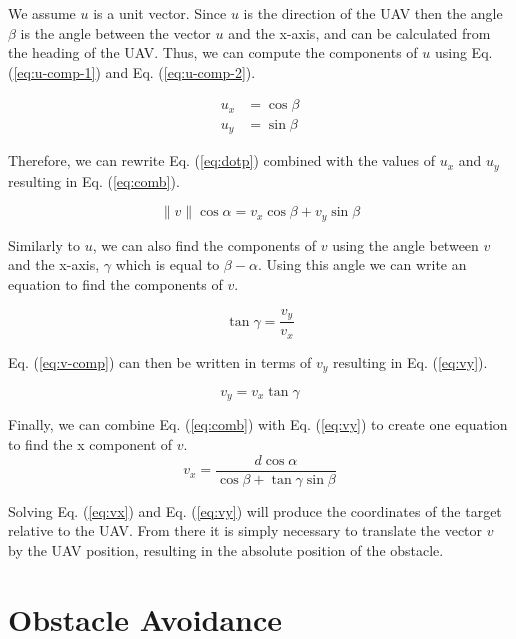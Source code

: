 We assume $u$ is a unit vector. Since $u$ is the direction of the UAV then the angle $\beta$ is the angle between the vector $u$
and the x-axis, and can be calculated from the heading of the UAV. Thus, we can compute the components of $u$ using Eq. 
(\ref{eq:u-comp-1}) and Eq. (\ref{eq:u-comp-2}). 

\begin{align}
	u_x &= \cos \beta
	\label{eq:u-comp-1} \\
	u_y &= \sin \beta
	\label{eq:u-comp-2}
\end{align}

Therefore, we can rewrite Eq. (\ref{eq:dotp}) combined with the values of $u_x$ and $u_y$ resulting in Eq. (\ref{eq:comb}). 

\begin{equation}
	\parallel v \parallel \cos \alpha =  v_x \cos \beta +  v_y \sin \beta
	\label{eq:comb}
\end{equation}

Similarly to $u$, we can also find the components of $v$ using the angle between $v$ and the x-axis, $\gamma$ which
is equal to $\beta - \alpha$. Using this angle we can write an equation to find the components of $v$. 

\begin{equation}
	\tan \gamma = \frac{v_y}{v_x}
	\label{eq:v-comp}
\end{equation}

Eq. (\ref{eq:v-comp}) can then be written in terms of $v_y$ resulting in Eq. (\ref{eq:vy}). 

\begin{equation}
	v_y = v_x \tan \gamma
	\label{eq:vy}
\end{equation}

Finally, we can combine Eq. (\ref{eq:comb}) with Eq. (\ref{eq:vy}) to create one equation to find the x component of $v$. 
\begin{equation}
	v_x = \frac{d \cos \alpha}{\cos \beta + \tan \gamma \sin \beta}
	\label{eq:vx}
\end{equation}

Solving Eq. (\ref{eq:vx}) and Eq. (\ref{eq:vy}) will produce the coordinates of the target relative to the UAV. 
From there it is simply necessary to translate the vector $v$ by the UAV position, resulting in the 
absolute position of the obstacle.

\section{Obstacle Avoidance}

